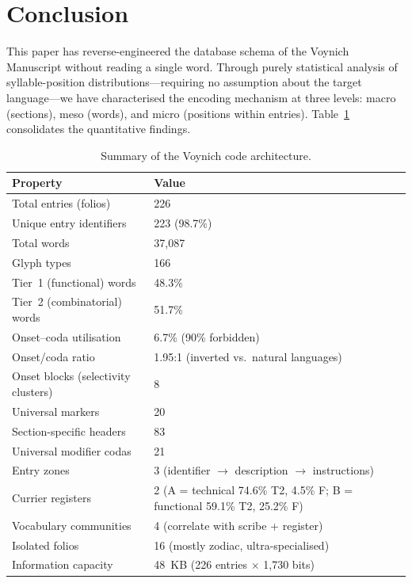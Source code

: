 \section{Conclusion}
\label{sec:conclusion}

This paper has reverse-engineered the database schema of the Voynich Manuscript without reading a single word.  Through purely statistical analysis of syllable-position distributions---requiring no assumption about the target language---we have characterised the encoding mechanism at three levels: macro (sections), meso (words), and micro (positions within entries).  Table~\ref{tab:summary} consolidates the quantitative findings.

\begin{table}[htbp]
\caption{Summary of the Voynich code architecture.}
\label{tab:summary}
\centering
\begin{tabular}{ll}
\toprule
\textbf{Property} & \textbf{Value} \\
\midrule
Total entries (folios) & 226 \\
Unique entry identifiers & 223 (98.7\%) \\
Total words & 37,087 \\
Glyph types & 166 \\
Tier~1 (functional) words & 48.3\% \\
Tier~2 (combinatorial) words & 51.7\% \\
Onset--coda utilisation & 6.7\% (90\% forbidden) \\
Onset/coda ratio & 1.95:1 (inverted vs.\ natural languages) \\
Onset blocks (selectivity clusters) & 8 \\
Universal markers & 20 \\
Section-specific headers & 83 \\
Universal modifier codas & 21 \\
Entry zones & 3 (identifier $\to$ description $\to$ instructions) \\
Currier registers & 2 (A = technical 74.6\% T2, 4.5\% F; B = functional 59.1\% T2, 25.2\% F) \\
Vocabulary communities & 4 (correlate with scribe + register) \\
Isolated folios & 16 (mostly zodiac, ultra-specialised) \\
Information capacity & 48~KB (226 entries $\times$ 1,730 bits) \\
\bottomrule
\end{tabular}
\end{table}

